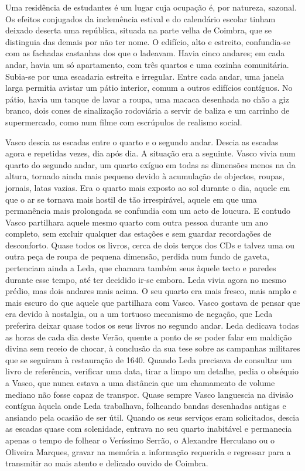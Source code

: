 Uma residência de estudantes é um lugar cuja ocupação é, por natureza,
sazonal. Os efeitos conjugados da inclemência estival e do calendário
escolar tinham deixado deserta uma república, situada na parte velha de
Coimbra, que se distinguia das demais por não ter nome. O edifício,
alto e estreito, confundia-se com as fachadas castanhas dos que o
ladeavam. Havia cinco andares; em cada andar, havia um só apartamento,
com três quartos e uma cozinha comunitária. Subia-se por uma escadaria
estreita e irregular. Entre cada andar, uma janela larga permitia
avistar um pátio interior, comum a outros edifícios contíguos. No pátio, havia um tanque de lavar a roupa,
uma macaca desenhada no chão a giz branco, dois cones de sinalização
rodoviária a servir de baliza e um carrinho de supermercado, como num
filme com escrúpulos de realismo social.

Vasco descia as escadas entre o quarto e o segundo andar. Descia as
escadas agora e repetidas vezes, dia após dia. A situação era a
seguinte. Vasco vivia num quarto do segundo andar, um quarto exíguo em
todas as dimensões menos na da altura, tornado ainda mais pequeno devido
à acumulação de objectos, roupas, jornais, latas vazias. Era o quarto
mais exposto ao sol durante o dia, aquele em que o ar se tornava mais
hostil de tão irrespirável, aquele em que uma permanência mais
prolongada se confundia com um acto de loucura. E contudo Vasco
partilhara aquele mesmo quarto com outra pessoa durante um ano completo,
sem excluir qualquer das estações e sem guardar recordações de
desconforto. Quase todos os livros, cerca de dois terços dos CDs e
talvez uma ou outra peça de roupa de pequena dimensão, perdida num fundo
de gaveta, pertenciam ainda a Leda, que chamara também seus àquele tecto
e paredes durante esse tempo, até ter decidido ir-se embora. Leda vivia
agora no mesmo prédio, mas dois andares mais acima. O seu quarto era
mais fresco, mais amplo e mais escuro do que aquele que partilhara com
Vasco. Vasco gostava de pensar que era devido à nostalgia, ou a um
tortuoso mecanismo de negação, que Leda preferira deixar quase todos os
seus livros no segundo andar. Leda dedicava todas as horas de cada dia
deste Verão, quente a ponto de se poder falar em maldição divina sem
receio de chocar, à conclusão da sua tese sobre as campanhas militares
que se seguiram à restauração de 1640. Quando Leda precisava de
consultar um livro de
referência, verificar uma data, tirar a limpo um detalhe, pedia o
obséquio a Vasco, que nunca estava a uma distância que um chamamento de
volume mediano não fosse capaz de transpor. Quase sempre Vasco
languescia na divisão contígua àquela onde Leda trabalhava, folheando
bandas desenhadas antigas e ansiando pela ocasião de ser útil. Quando os
seus serviços eram solicitados, descia as escadas quase com solenidade,
entrava no seu quarto inabitável e permanecia apenas o tempo de
folhear o Veríssimo Serrão, o Alexandre Herculano ou o Oliveira Marques,
gravar na memória a informação requerida e regressar para a transmitir
ao mais atento e delicado ouvido de Coimbra.

